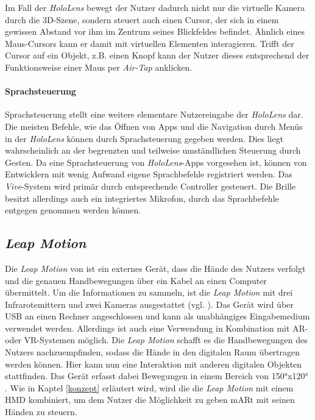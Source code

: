 Im Fall der \textit{HoloLens} bewegt der Nutzer dadurch nicht nur die virtuelle Kamera durch die 3D-Szene, sondern steuert auch einen Cursor, der sich in einem gewissen Abstand vor ihm im Zentrum seines Blickfeldes befindet. Ähnlich eines Maus-Cursors kann er damit mit virtuellen Elementen interagieren. Trifft der Cursor auf ein Objekt, z.B. einen Knopf kann der Nutzer dieses entsprechend der Funktionsweise einer Maus per \textit{Air-Tap} anklicken. 

\paragraph{Sprachsteuerung}

Sprachsteuerung stellt eine weitere elementare Nutzereingabe der \textit{HoloLens} dar. 
Die meisten Befehle, wie das Öffnen von Apps und die Navigation durch Menüs in der \textit{HoloLens} können durch Sprachsteuerung gegeben werden. 
Dies liegt wahrscheinlich an der begrenzten und teilweise umständlichen Steuerung durch Gesten. Da eine Sprachsteuerung von \textit{HoloLens}-Apps vorgesehen ist, können von Entwicklern mit wenig Aufwand eigene Sprachbefehle registriert werden.
Das \textit{Vive}-System wird primär durch entsprechende Controller gesteuert. Die Brille besitzt allerdings auch ein integriertes Mikrofon, durch das Sprachbefehle entgegen genommen werden können.


\subsection{\textit{Leap Motion}}

Die \textit{Leap Motion} von \cite{leapMotion} ist ein externes Gerät, dass die Hände des Nutzers verfolgt und die genauen Handbewegungen über ein Kabel an einen Computer übermittelt. 
Um die Informationen zu sammeln, ist die \textit{Leap Motion} mit drei Infrarotemittern und zwei Kameras ausgestattet (vgl. \cite{Weichert13}). Das Gerät wird über USB an einen Rechner angeschlossen und kann als unabhängiges Eingabemedium verwendet werden. Allerdings ist auch eine Verwendung in Kombination mit AR- oder VR-Systemen möglich. 
Die \textit{Leap Motion} schafft es die Handbewegungen des Nutzers nachzuempfinden, sodass die Hände in den digitalen Raum übertragen werden können. Hier kann nun eine Interaktion mit anderen digitalen Objekten stattfinden. Das Gerät erfasst dabei Bewegungen in einem Bereich von 150°x120° \cite{leapFOV}.
Wie in Kaptel \ref{konzept} erläutert wird, wird die die \textit{Leap Motion} mit einem HMD kombiniert, um dem Nutzer die Möglichkeit zu geben mARt mit seinen Händen zu steuern.








